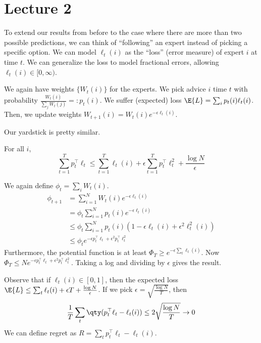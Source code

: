 \section{Lecture 2}
To extend our results from before
to the case where there are more than two possible predictions,
we can think of ``following'' an expert instead of
picking a specific option.
We can model $\ell_t(i)$ as the ``loss'' (error measure) of expert $i$
at time $t$. We can generalize the loss to model fractional errors, allowing $\ell_t(i) \in [0, \infty)$.

\begin{algothm}
    We again have weights $\{W_t(i)\}$ for the experts.
    We pick advice $i$ time $t$ with probability $\frac{W_t(i)}{\sum_j W_t(j)} =: p_t(i)$.
    We suffer (expected) loss $\E{L} = \sum_i p_t(i) \ell_t(i)$. Then,
    we update weights $W_{t + 1}(i) = W_t(i) e^{-\epsilon \ell_t(i)}$.
\end{algothm}

Our yardstick is pretty similar.

\begin{theorem}
    For all $i$,
    \[ \sum_{t = 1}^T p_t^{\top} \ell_t \le \sum_{t=1}^T \ell_t(i) + \epsilon \sum_{t=1}^{T} p_t^{\top} \ell_t^2 + \frac{\log N}{\epsilon}  \] 
    \begin{proof*}
        We again define $\phi_t = \sum_i W_{t}(i)$.
        \begin{align*}
            \phi_{t + 1} &= \sum_{i = 1}^{N} W_t(i) e^{-\epsilon \ell_t(i)} \\
            &= \phi_t \sum_{i = 1}^N p_t(i) e^{-\epsilon \ell_t(i)} \\
            &\le \phi_t \sum_{i = 1}^N p_t(i) (1 - \epsilon \ell_t(i) + \epsilon^2 \ell^2_t(i)) \\
            &\le \phi_t e^{-\epsilon p_t^{\top} \ell_t + \epsilon^2 p_t^{\top} \ell_t^2 }
        \end{align*}
        Furthermore, the potential function is at least $\Phi_T \ge e^{-\epsilon \sum_t \ell_t(i)}$.
        Now $\Phi_T \le N e^{-\epsilon p_t^{\top} \ell_t + \epsilon^2 p_t^{\top} \ell_t^2 }$.
        Taking a log and dividing by $\epsilon$ gives the result.
    \end{proof*}
\end{theorem}

Observe that if $\ell_t(i) \in [0, 1]$, then the expected loss $\E{L} \le \sum_t \ell_t(i) + \epsilon T + \frac{\log N}{\epsilon}$.
If we pick $\epsilon = \sqrt{\frac{\log N}{T}}$, then
\[ \frac{1}{T} \sum_t \qty(p_t^{\top} \ell_t - \ell_t(i)) \le 2 \sqrt{\frac{\log N}{T}} \to 0\]
We can define regret as $R = \sum_t p_t^{\top} \ell_t - \ell_t(i)$.

